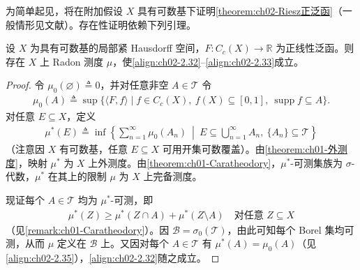 \documentclass[../../main.tex]{subfiles}%
\begin{document}
为简单起见，将在附加假设 $X$ 具有可数基下证明\cref{theorem:ch02-Riesz正泛函}（一般情形见文献\cite{ref45}）。存在性证明依赖下列引理。

\begin{lemma}\label{lemma:ch02-Riesz构造}
设 $X$ 为具有可数基的局部紧 Hausdorff 空间，$F:C_c(X)\to\mathbb R$ 为正线性泛函。则存在 $X$ 上 Radon 测度 $\mu$，使\eqref{align:ch02-2.32}--\eqref{align:ch02-2.33}成立。
\end{lemma}

\begin{proof}
令 $\mu_0(\varnothing )\triangleq 0$，并对任意非空 $A\in\mathscr T$ 令
\begin{align}
\mu_0(A)\triangleq \sup\{\langle F,f\rangle\mid f\in C_c(X),\ f(X)\subseteq[0,1],\ \operatorname{supp}f\subseteq A\}. \label{align:ch02-2.34}
\end{align}
对任意 $E\subseteq X$，定义
\begin{align}
\mu^*(E)\triangleq \inf\left\{\sum_{n=1}^\infty\mu_0(A_n)\ \middle|\ E\subseteq\bigcup_{n=1}^\infty A_n,\ \{A_n\}\subseteq\mathscr T\right\} \label{align:ch02-2.35}
\end{align}
（注意因 $X$ 有可数基，任意 $E\subseteq X$ 可用开集可数覆盖）。由\cref{theorem:ch01-外测度}，映射 $\mu^*$ 为 $X$ 上外测度。由\cref{theorem:ch01-Caratheodory}，$\mu^*$-可测集族为 $\sigma$-代数，$\mu^*$ 在其上的限制 $\mu$ 为 $X$ 上完备测度。

现证每个 $A\in\mathscr T$ 均为 $\mu^*$-可测，即
\begin{align}
\mu^*(Z)\geqslant\mu^*(Z\cap A)+\mu^*(Z\setminus A)\quad\text{对任意 }Z\subseteq X \label{align:ch02-2.36}
\end{align}
（见\cref{remark:ch01-Caratheodory}）。因 $\mathscr B=\sigma_0(\mathscr T)$，由此可知每个 Borel 集均可测，从而 $\mu$ 定义在 $\mathscr B$ 上。又因对每个 $A\in\mathscr T$ 有 $\mu^*(A)=\mu_0(A)$（见\eqref{align:ch02-2.35}），\eqref{align:ch02-2.32}随之成立。


\end{proof}
\end{document}
